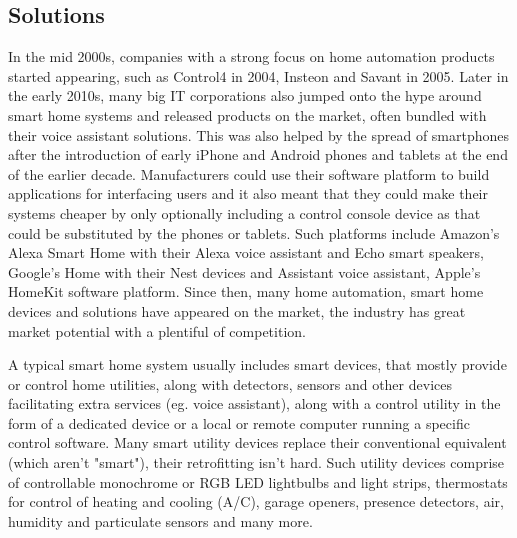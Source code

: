 \subsection{Solutions}

In the mid 2000s, companies with a strong focus on home automation products started appearing, such as Control4 in 2004, Insteon and Savant in 2005. \cite{Control4about} \cite{WPInsteonFirstLook} \cite{SavantCompInfo}\break
Later in the early 2010s, many big IT corporations also jumped onto the hype around smart home systems and released products on the market, often bundled with their voice assistant solutions. This was also helped by the spread of smartphones after the introduction of early iPhone and Android phones and tablets at the end of the earlier decade. Manufacturers could use their software platform to build applications for interfacing users and it also meant that they could make their systems cheaper by only optionally including a control console device as that could be substituted by the phones or tablets. Such platforms include Amazon's Alexa Smart Home with their Alexa voice assistant and Echo smart speakers, Google's Home with their Nest devices and Assistant voice assistant, Apple's HomeKit software platform. \cite{AmazonAlexaSH} \cite{GoogleHome} \cite{GoogleAssistant} \cite{AppleHome} Since then, many home automation, smart home devices and solutions have appeared on the market, the industry has great market potential with a plentiful of competition. \cite{ChakSHS}

A typical smart home system usually includes smart devices, that mostly provide or control home utilities, along with detectors, sensors and other devices facilitating extra services (eg. voice assistant), along with a control utility in the form of a dedicated device or a local or remote computer running a specific control software. Many smart utility devices replace their conventional equivalent (which aren't "smart"), their retrofitting isn't hard. Such utility devices comprise of controllable monochrome or RGB LED lightbulbs and light strips, thermostats for control of heating and cooling (A/C), garage openers, presence detectors, air, humidity and particulate sensors and many more. \cite{TechTargetSH}

